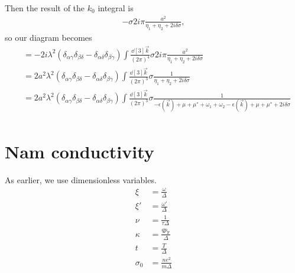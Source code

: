 \documentclass{article}
\newcommand{\vf}{p_{\mathrm{F}}}
\newcommand{\corr}{\mu^\ast}
\begin{document}
Then the result of the $k_0$ integral is
\begin{align}
	-\sigma 2 i \pi \frac{a^2}{\eta_1 + \eta_2 + 2 i \delta \sigma},
\end{align}
so our diagram becomes
\begin{align}
	&= - 2 i \lambda^2 \left(\delta_{\alpha\gamma} \delta_{\beta\delta} -  \delta_{\alpha\delta} \delta_{\beta \gamma}\right)\int \frac{\dd[3]{\vec{k}}}{\left(2\pi\right)^4} \sigma 2 i \pi \frac{a^2}{\eta_1 + \eta_2 + 2 i \delta \sigma} \\
	&= 2 a^2 \lambda^2 \left(\delta_{\alpha\gamma} \delta_{\beta\delta} -  \delta_{\alpha\delta} \delta_{\beta \gamma}\right)\int \frac{\dd[3]{\vec{k}}}{\left(2\pi\right)^3} \sigma \frac{1}{\eta_1 + \eta_2 + 2 i \delta \sigma} \\
	&= 2 a^2 \lambda^2 \left(\delta_{\alpha\gamma} \delta_{\beta\delta} -  \delta_{\alpha\delta} \delta_{\beta \gamma}\right)\int \frac{\dd[3]{\vec{k}}}{\left(2\pi\right)^3} \sigma \frac{1}{ - \epsilon(\vec{k}) + \mu + \corr + \omega_1 + \omega_2 - \epsilon(\vec{k}) + \mu + \corr + 2 i \delta \sigma} \\
\end{align}

\section{Nam conductivity}
As earlier, we use dimensionless variables.
\begin{align}
	\xi &= \frac{\omega}{\Delta} \\
	\xi' &= \frac{\omega'}{\Delta} \\
	\nu &= \frac{1}{\tau \Delta} \\
	\kappa &= \frac{q \vf}{\Delta} \\
	t &= \frac{T}{\Delta} \\
	\sigma_0 &= \frac{n e^2}{m \Delta}
\end{align}
\end{document}
